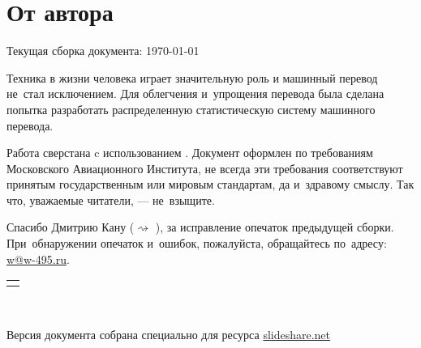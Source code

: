 
\section*{От автора}

\begin{flushright}
	{\magic Текущая сборка документа: \today \ \thistime \\}
\end{flushright}
Техника в жизни человека играет значительную роль 
и машинный перевод не~стал исключением. 
Для облегчения и~упрощения перевода 
была сделана попытка разработать 
распределенную статистическую систему машинного перевода.

Работа сверстана c использованием {\comic \XeLaTeX}.
Документ оформлен по требованиям Московского Авиационного Института,
не всегда эти требования соответствуют принятым государственным или мировым стандартам,
да и~здравому смыслу. Так что, уважаемые читатели, --- не~взыщите.

Спасибо Дмитрию Кану ($\rightsquigarrow$ \cite{Кан:2011}), за исправление опечаток предыдущей сборки.
При~обнаружении опечаток и~ошибок, пожалуйста, обращайтесь по~адресу: 
\href{mailto:w@w-495.ru}{{\color{teal} w@w-495.ru}}.\\

\begin{center}
	\vspace{12pt}
	\begin{tabular}{p{7cm}}
		\hline \\
	\end{tabular}\\
	\vspace{12pt}
\end{center}
{\libertine
    Версия документа собрана специально для
    ресурса \href{http://www.slideshare.net/}{slideshare.net}

}

\pagebreak


